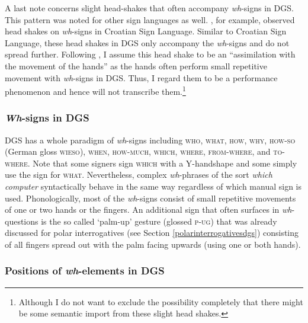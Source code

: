 A last note concerns slight head-shakes that often accompany \textit{wh}-signs in DGS. This pattern was noted for other sign languages as well. \citet[232--235]{sarac2007cross}, for example, observed head shakes on \textit{wh}-signs in Croatian Sign Language. Similar to Croatian Sign Language, these head shakes in DGS only accompany the \textit{wh}-signs and do not spread further. Following \citet[235]{sarac2007cross}, I assume this head shake to be an ``assimilation with the movement of the hands'' as the hands often perform small repetitive movement with \textit{wh}-signs in DGS. Thus, I regard them to be a performance phenomenon and hence will not transcribe them.\footnote{Although I do not want to exclude the possibility completely that there might be some semantic import from these slight head shakes.}

\subsubsection{\textit{Wh}-signs in DGS}


DGS has a whole paradigm of \textit{wh}-signs including \textsc{who}, \textsc{what}, \textsc{how}, \textsc{why}, \textsc{how-so} (German gloss \textsc{wieso}), \textsc{when}, \textsc{how-much}, \textsc{which}, \textsc{where}, \textsc{from-where}, and \textsc{to-where}. Note that some signers sign \textsc{which} with a Y-handshape and some simply use the sign for \textsc{what}. Nevertheless, complex \textit{wh}-phrases of the sort \textit{which computer} syntactically behave in the same way regardless of which manual sign is used. Phonologically, most of the \textit{wh}-signs consist of small repetitive movements of one or two hands or the fingers. An additional sign that often surfaces in \textit{wh}-questions is the so called `palm-up' gesture (glossed \textsc{p-ug}) that was already discussed for polar interrogatives (see Section \ref{polarinterrogativesdgs}) consisting of all fingers spread out with the palm facing upwards (using one or both hands). 

\subsubsection{Positions of \textit{wh}-elements in DGS}

